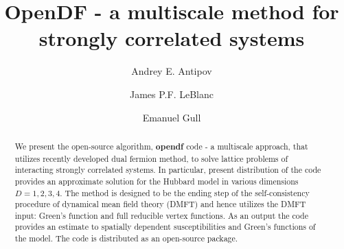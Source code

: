 \documentclass[3p,times,procedia]{elsarticle}
\begin{document}
\begin{frontmatter}




\title{OpenDF - a multiscale method for strongly correlated systems }




\author[a]{Andrey E. Antipov} 
\author[a]{James P.F. LeBlanc}
\author[a]{Emanuel Gull}

\address[a]{Department of Physics, University of Michigan, Ann Arbor, Michigan 48109, USA}

\begin{abstract}
We present the open-source algorithm, \textbf{opendf} code -  a multiscale approach, that utilizes recently developed dual fermion method, to solve lattice problems of interacting strongly correlated systems. In particular, present distribution of the code provides an approximate solution for the Hubbard model in various dimensions $D=1,2,3,4$. The method is designed to be the ending step of the self-consistency procedure of dynamical mean field theory (DMFT) and hence utilizes the DMFT input: Green's function and full reducible vertex functions. As an output the code provides an estimate to spatially dependent susceptibilities and Green's functions of the model. The code is distributed as an open-source package. 
\end{abstract}


\end{frontmatter}
\end{document}
